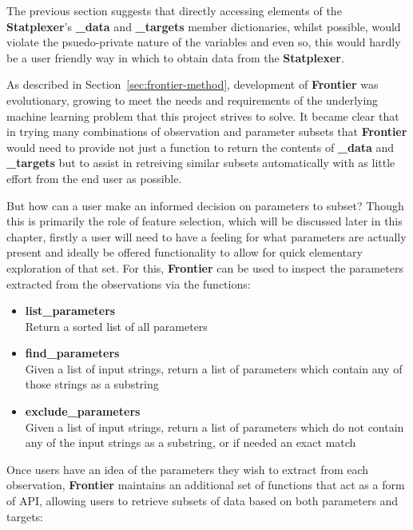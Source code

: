 The previous section suggests that directly accessing elements of the
\textbf{Statplexer}'s \textbf{\_data} and \textbf{\_targets} member dictionaries,
whilst possible, would violate the psuedo-private nature of the variables and even
so, this would hardly be a user friendly way in which to obtain data from the
\textbf{Statplexer}.

As described in Section~\ref{sec:frontier-method}, development of
\textbf{Frontier} was evolutionary, growing to meet the needs and requirements
of the underlying machine learning problem that this project strives to solve.
It became clear that in trying many combinations of observation and parameter
subsets that \textbf{Frontier} would need to provide not just a function to
return the contents of \textbf{\_data} and \textbf{\_targets} but to assist in
retreiving similar subsets automatically with as little effort from the end user
as possible.

But how can a user make an informed decision on parameters to subset?
Though this is primarily the role of feature selection, which will be discussed
later in this chapter, firstly a user will need to have a feeling for what
parameters are actually present and ideally be offered functionality to
allow for quick elementary exploration of that set. For this, \textbf{Frontier}
can be used to inspect the parameters extracted from the observations via the
functions:

\begin{itemize}
    \item \textbf{list\_parameters} \hfill\\
        Return a sorted list of all parameters
    \item \textbf{find\_parameters} \hfill\\
        Given a list of input strings, return a list of parameters which contain
        any of those strings as a substring
    \item \textbf{exclude\_parameters} \hfill\\
        Given a list of input strings, return a list of parameters which do not
        contain any of the input strings as a substring, or if needed an exact
        match
\end{itemize}

Once users have an idea of the parameters they wish to extract from each
observation, \textbf{Frontier} maintains an additional set of functions that act
as a form of API, allowing users to retrieve subsets of data based on both
parameters and targets:

